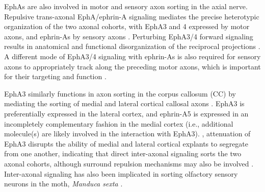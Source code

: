 EphAs are also involved in motor and sensory axon sorting in the axial nerve.
Repulsive trans-axonal EphA/ephrin-A signaling mediates the precise heterotypic organization of the two axonal cohorts, with EphA3 and 4 expressed by motor axons, and ephrin-As by sensory axons \cite{gallarda2008segregation}.
Perturbing EphA3/4 forward signaling results in anatomical and functional disorganization of the reciprocal projections \cite{gallarda2008segregation}.
A different mode of EphA3/4 signaling with ephrin-As is also required for sensory axons to appropriately track along the preceding motor axons, which is important for their targeting and function \cite{wang2011anatomical}.

EphA3 similarly functions in axon sorting in the corpus callosum (CC) by mediating the sorting of medial and lateral cortical callosal axons \cite{nishikimi2011segregation}.
EphA3 is preferentially expressed in the lateral cortex, and ephrin-A5 is expressed in an incompletely complementary fashion in the medial cortex (i.e., additional molecule(s) are likely involved in the interaction with EphA3).
\Invitro{}, attenuation of EphA3 disrupts the ability of medial and lateral cortical explants to segregate from one another, indicating that direct inter-axonal signaling sorts the two axonal cohorts, although surround repulsion mechanisms may also be involved \invivo{} \cite{nishikimi2011segregation}.
Inter-axonal signaling has also been implicated in sorting olfactory sensory neurons in the moth, \emph{Manduca sexta} \cite{kaneko2003interaxonal}.
